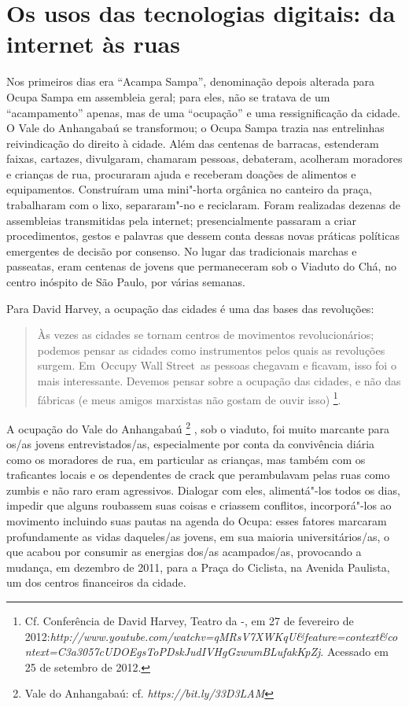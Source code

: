 \section{Os usos das tecnologias digitais: da internet às ruas }

Nos primeiros dias era ``Acampa Sampa'', denominação depois alterada
para Ocupa Sampa em assembleia geral; para eles, não se tratava de um
``acampamento'' apenas, mas de uma ``ocupação'' e uma ressignificação da
cidade. O Vale do Anhangabaú se transformou; o Ocupa Sampa trazia nas
entrelinhas reivindicação do direito à cidade. Além das centenas de
barracas, estenderam faixas, cartazes, divulgaram, chamaram pessoas,
debateram, acolheram moradores e crianças de rua, procuraram ajuda e
receberam doações de alimentos e equipamentos. Construíram uma
mini"-horta orgânica no canteiro da praça, trabalharam com o lixo,
separaram"-no e reciclaram. Foram realizadas dezenas de assembleias
transmitidas pela internet; presencialmente passaram a criar
procedimentos, gestos e palavras que dessem conta dessas novas práticas
políticas emergentes de decisão por consenso. No lugar das tradicionais
marchas e passeatas, eram centenas de jovens que permaneceram sob o
Viaduto do Chá, no centro inóspito de São Paulo, por várias semanas.

Para David Harvey, a ocupação das cidades é uma das bases das
revoluções:

\begin{quote}
Às vezes as cidades se tornam centros de movimentos revolucionários;
podemos pensar as cidades como instrumentos pelos quais as revoluções
surgem. Em~Occupy Wall Street~as pessoas chegavam e ficavam, isso foi o
mais interessante. Devemos pensar sobre a ocupação das cidades, e não
das fábricas (e meus amigos marxistas não gostam de ouvir isso)
\footnote{Cf. Conferência de David Harvey, Teatro da -, em 27 de
  fevereiro de
  2012:\emph{http://www.youtube.com/watchv=qMRsV7XWKqU\&feature=context\&context=C3a3057cUDOEgsToPDskJudIVHgGzwumBLufakKpZj}. %
  Acessado em 25 de setembro de 2012.}.
\end{quote}

A ocupação do Vale do Anhangabaú \footnote{Vale do Anhangabaú: cf.
  \emph{https://bit.ly/33D3LAM}} , sob o
viaduto, foi muito marcante para os/as jovens entrevistados/as,
especialmente por conta da convivência diária como os moradores de rua,
em particular as crianças, mas também com os traficantes locais e os
dependentes de crack que perambulavam pelas ruas como zumbis e não raro
eram agressivos. Dialogar com eles, alimentá"-los todos os dias, impedir
que alguns roubassem suas coisas e criassem conflitos, incorporá"-los ao
movimento incluindo suas pautas na agenda do Ocupa: esses fatores
marcaram profundamente as vidas daqueles/as jovens, em sua maioria
universitários/as, o que acabou por consumir as energias dos/as
acampados/as, provocando a mudança, em dezembro de 2011, para a Praça do
Ciclista, na Avenida Paulista, um dos centros financeiros da cidade.

